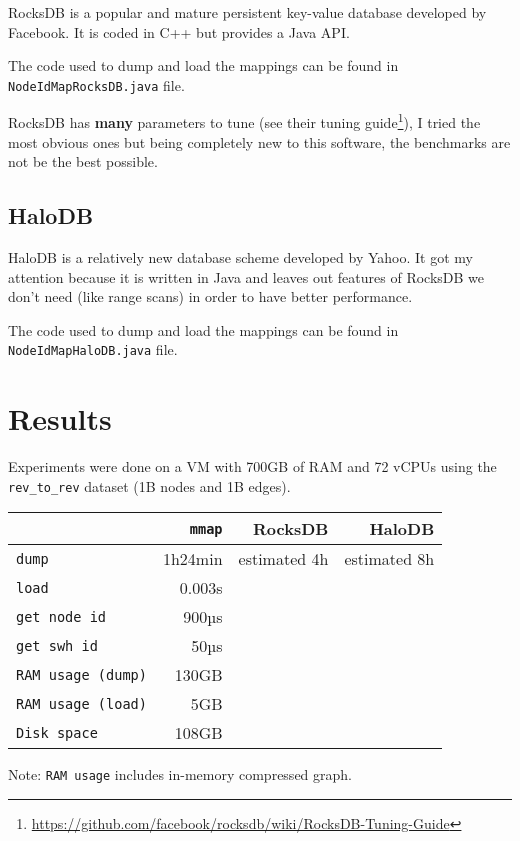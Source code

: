 \documentclass[11pt,a4paper]{article}
\newcommand{\mmap}{\texttt{mmap}}
\begin{document}
RocksDB is a popular and mature persistent key-value database developed by
Facebook. It is coded in C++ but provides a Java API.

The code used to dump and load the mappings can be found in
\texttt{NodeIdMapRocksDB.java} file.

RocksDB has \textbf{many} parameters to tune (see their tuning
guide\footnote{\url{https://github.com/facebook/rocksdb/wiki/RocksDB-Tuning-Guide}}),
I tried the most obvious ones but being completely new to this software, the
benchmarks are not be the best possible.

\subsection{HaloDB}

HaloDB is a relatively new database scheme developed by Yahoo. It got my
attention because it is written in Java and leaves out features of RocksDB we
don't need (like range scans) in order to have better performance.

The code used to dump and load the mappings can be found in
\texttt{NodeIdMapHaloDB.java} file.

\newpage

\section{Results}

Experiments were done on a VM with 700GB of RAM and 72 vCPUs using the
\texttt{rev_to_rev} dataset (1B nodes and 1B edges).

\begin{center}
    \begin{tabular}{@{} l *3r @{}}
        \toprule
        \multicolumn{1}{c}{} &
            \textbf{\mmap{}} & \textbf{RocksDB} &
            \textbf{HaloDB} \\
        \midrule
        \texttt{dump}
            & 1h24min & estimated 4h & estimated 8h \\
        \texttt{load}
            & 0.003s & & \\
        \texttt{get node id}
            & ~900µs & & \\
        \texttt{get swh id}
            & ~50µs & & \\
        \texttt{RAM usage (dump)}
            & 130GB & & \\
        \texttt{RAM usage (load)}
            & 5GB & & \\
        \texttt{Disk space}
            & 108GB & & \\
        \bottomrule
    \end{tabular}
\end{center}

Note: \texttt{RAM usage} includes in-memory compressed graph.
\end{document}
